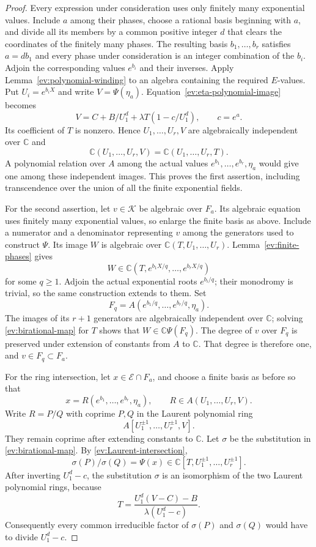 \documentclass[11pt,a4paper]{article}
\numberwithin{equation}{section}
\theoremstyle{definition}
\theoremstyle{remark}
\begin{document}
\begin{proof}
Every expression under consideration uses only finitely many exponential
values.  Include $a$ among their phases, choose a rational basis
beginning with $a$, and divide all its members by a common positive
integer $d$ that clears the coordinates of the finitely many phases.
The resulting basis $b_1,\ldots,b_r$ satisfies $a=db_1$ and every
phase under consideration is an integer combination of the $b_i$.
Adjoin the corresponding values $e^{b_i}$ and their inverses.
Apply Lemma~\ref{ev:polynomial-winding} to an algebra
containing the required $E$-values.  Put $U_i=e^{b_iX}$ and write
$V=\Psi(\eta_a)$.  Equation~\eqref{ev:eta-polynomial-image} becomes
\begin{equation}\label{ev:birational-map}
 V=C+B/U_1^d+\lambda T(1-c/U_1^d),\qquad c=e^a.
\end{equation}
Its coefficient of $T$ is nonzero.  Hence $U_1,\ldots,U_r,V$ are
algebraically independent over $\mathbb C$ and
\[
 \mathbb C(U_1,\ldots,U_r,V)
   =\mathbb C(U_1,\ldots,U_r,T).
\]
A polynomial relation over $A$ among the actual values
$e^{b_1},\ldots,e^{b_r},\eta_a$ would give one among these independent
images.  This proves the first assertion, including transcendence over
the union of all the finite exponential fields.

For the second assertion, let $v\in\mathcal K$ be algebraic over
$F_a$.  Its algebraic equation uses finitely many exponential values,
so enlarge the finite basis as above.  Include a numerator and a
denominator representing $v$ among the generators used to construct
$\Psi$.  Its image $W$ is algebraic over
$\mathbb C(T,U_1,\ldots,U_r)$.  Lemma~\ref{ev:finite-phases} gives
\[
 W\in\mathbb C(T,e^{b_1X/q},\ldots,e^{b_rX/q})
\]
for some $q\ge1$.  Adjoin the actual exponential roots $e^{b_i/q}$;
their monodromy is trivial, so the same construction extends to them.
Set
\[
 F_q=A(e^{b_1/q},\ldots,e^{b_r/q},\eta_a).
\]
The images of its $r+1$ generators are algebraically independent over
$\mathbb C$; solving \eqref{ev:birational-map} for $T$ shows that
$W\in\mathbb C\Psi(F_q)$.  The degree of $v$ over $F_q$ is preserved
under extension of constants from $A$ to $\mathbb C$.  That degree
is therefore one, and $v\in F_q\subset F_a$.

For the ring intersection, let $x\in\mathcal E\cap F_a$, and choose
a finite basis as before so that
\[
 x=R(e^{b_1},\ldots,e^{b_r},\eta_a),\qquad
 R\in A(U_1,\ldots,U_r,V).
\]
Write $R=P/Q$ with coprime $P,Q$ in the Laurent polynomial ring
\[
 A[U_1^{\pm1},\ldots,U_r^{\pm1},V].
\]
They remain coprime after extending constants to $\mathbb C$.
Let $\sigma$ be the substitution in \eqref{ev:birational-map}.
By \eqref{ev:Laurent-intersection},
\[
 \sigma(P)/\sigma(Q)=\Psi(x)
   \in\mathbb C[T,U_1^{\pm1},\ldots,U_r^{\pm1}].
\]
After inverting $U_1^d-c$, the substitution $\sigma$ is an isomorphism
of the two Laurent polynomial rings, because
\[
 T=\frac{U_1^d(V-C)-B}{\lambda(U_1^d-c)}.
\]
Consequently every common irreducible factor of $\sigma(P)$ and
$\sigma(Q)$ would have to divide $U_1^d-c$.


\end{proof}
\end{document}

